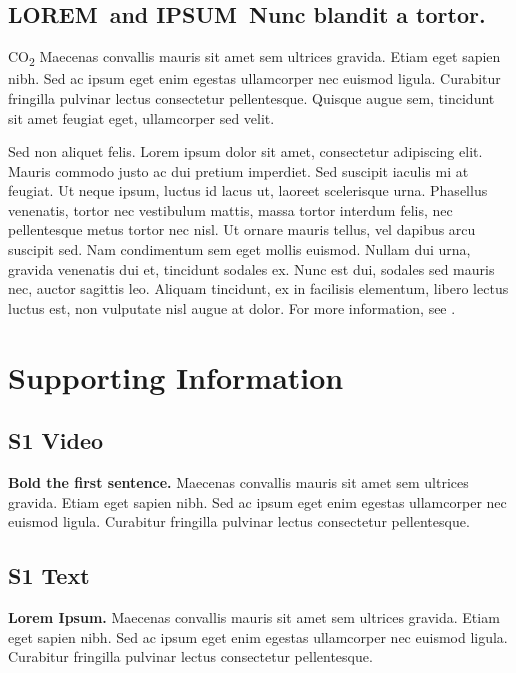 \documentclass[10pt,letterpaper]{article}
\newcommand{\lorem}{{\bf LOREM}}
\newcommand{\ipsum}{{\bf IPSUM}}
\begin{document}
\subsection*{\lorem\ and \ipsum\ Nunc blandit a tortor.}

CO\textsubscript{2} Maecenas convallis mauris sit amet sem ultrices gravida. Etiam eget sapien nibh. Sed ac ipsum eget enim egestas ullamcorper nec euismod ligula. Curabitur fringilla pulvinar lectus consectetur pellentesque. Quisque augue sem, tincidunt sit amet feugiat eget, ullamcorper sed velit. 

Sed non aliquet felis. Lorem ipsum dolor sit amet, consectetur adipiscing elit. Mauris commodo justo ac dui pretium imperdiet. Sed suscipit iaculis mi at feugiat. Ut neque ipsum, luctus id lacus ut, laoreet scelerisque urna. Phasellus venenatis, tortor nec vestibulum mattis, massa tortor interdum felis, nec pellentesque metus tortor nec nisl. Ut ornare mauris tellus, vel dapibus arcu suscipit sed. Nam condimentum sem eget mollis euismod. Nullam dui urna, gravida venenatis dui et, tincidunt sodales ex. Nunc est dui, sodales sed mauris nec, auctor sagittis leo. Aliquam tincidunt, ex in facilisis elementum, libero lectus luctus est, non vulputate nisl augue at dolor. For more information, see .

\section*{Supporting Information}

\subsection*{S1 Video}
\label{S1_Video}
{\bf Bold the first sentence.}  Maecenas convallis mauris sit amet sem ultrices gravida. Etiam eget sapien nibh. Sed ac ipsum eget enim egestas ullamcorper nec euismod ligula. Curabitur fringilla pulvinar lectus consectetur pellentesque.

\subsection*{S1 Text}
\label{S1_Text}
{\bf Lorem Ipsum.} Maecenas convallis mauris sit amet sem ultrices gravida. Etiam eget sapien nibh. Sed ac ipsum eget enim egestas ullamcorper nec euismod ligula. Curabitur fringilla pulvinar lectus consectetur pellentesque.
\end{document}
